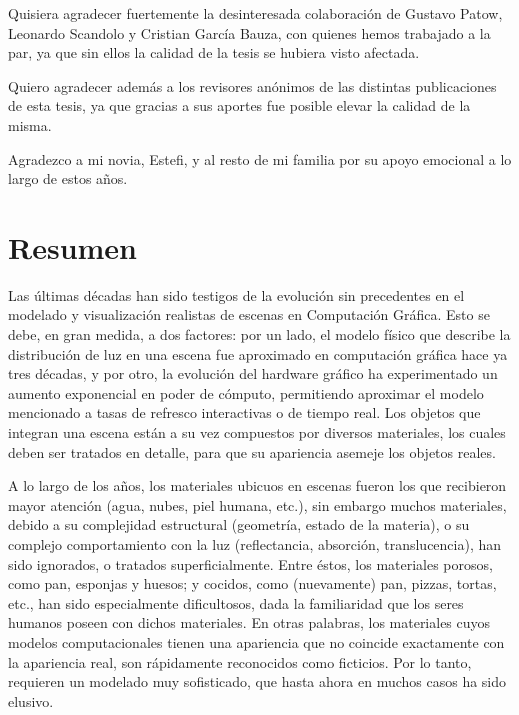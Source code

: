 \documentclass[spanish,a4paper,oneside,10pt,openright]{book}
\begin{document}
Quisiera agradecer fuertemente la desinteresada colaboración de Gustavo Patow, Leonardo Scandolo y Cristian García Bauza, con quienes hemos trabajado a la par, ya que sin ellos la calidad de la tesis se hubiera visto afectada.

Quiero agradecer además a los revisores anónimos de las distintas publicaciones de esta tesis, ya que gracias a sus aportes fue posible elevar la calidad de la misma.

Agradezco a mi novia, Estefi, y al resto de mi familia por su apoyo emocional a lo largo de estos años.

\phantom{p. 1}
\clearpage
\thispagestyle{empty}
\phantom{p. 2}
\clearpage

\chapter*{Resumen} %

Las últimas décadas han sido testigos de la evolución sin precedentes en el modelado y visualización realistas de escenas en Computación Gráfica.
Esto se debe, en gran medida, a dos factores: por un lado, el modelo físico que describe la distribución de luz en una escena fue aproximado en computación gráfica hace ya tres décadas, y por otro, la evolución del hardware gráfico ha experimentado un aumento exponencial en poder de cómputo, permitiendo aproximar el modelo mencionado a tasas de refresco interactivas o de tiempo real.
Los objetos que integran una escena están a su vez compuestos por diversos materiales, los cuales deben ser tratados en detalle, para que su apariencia asemeje los objetos reales.

A lo largo de los años, los materiales ubicuos en escenas fueron los que recibieron mayor atención (agua, nubes, piel humana, etc.), sin embargo muchos materiales, debido a su complejidad estructural (geometría, estado de la materia), o su complejo comportamiento con la luz (reflectancia, absorción, translucencia), han sido ignorados, o tratados superficialmente.
Entre éstos, los materiales porosos, como pan, esponjas y huesos; y cocidos, como (nuevamente) pan, pizzas, tortas, etc., han sido especialmente dificultosos, dada la familiaridad que los seres humanos poseen con dichos materiales.
En otras palabras, los materiales cuyos modelos computacionales tienen una apariencia que no coincide exactamente con la apariencia real, son rápidamente reconocidos como ficticios. Por lo tanto, requieren un modelado muy sofisticado, que hasta ahora en muchos casos ha sido elusivo.
\end{document}
